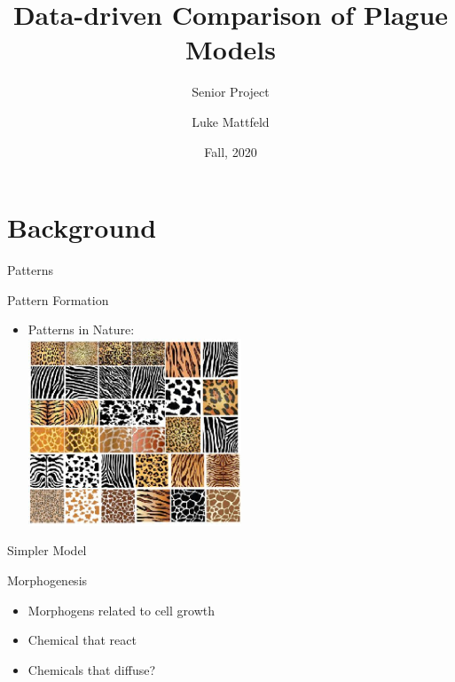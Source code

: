 \documentclass[t,10pt,fleqn]{beamer}
\title[Reaction-Diffusion Equations]%
      {Data-driven Comparison of Plague Models}
\subtitle{Senior Project}
\author[Luke Mattfeld]{Luke Mattfeld}
\institute[EWU]{Eastern Washington University}
\date{Fall, 2020}
\begin{document}
\begin{frame}
\titlepage

\end{frame}
\section{Background}
\begin{frame}{Patterns}
\vspace{-.3cm}
\begin{block}{Pattern Formation}
  \begin{itemize}
    \pause
    \item Patterns in Nature:
    \pause
    \\
    \includegraphics[width=0.5\textwidth]{creature_patterns2.png}
  \end{itemize}
\end{block}
\pause
\end{frame}

\begin{frame}{Simpler Model}
  \vspace{-.3cm}
  \begin{block}{Morphogenesis}
    \begin{itemize}
      \pause
      \item Morphogens related to cell growth
      \pause
      \item Chemical that react
      \pause
      \item Chemicals that diffuse?
      \pause
    \end{itemize}
  \end{block}
  \pause
  \end{frame}
\end{document}
